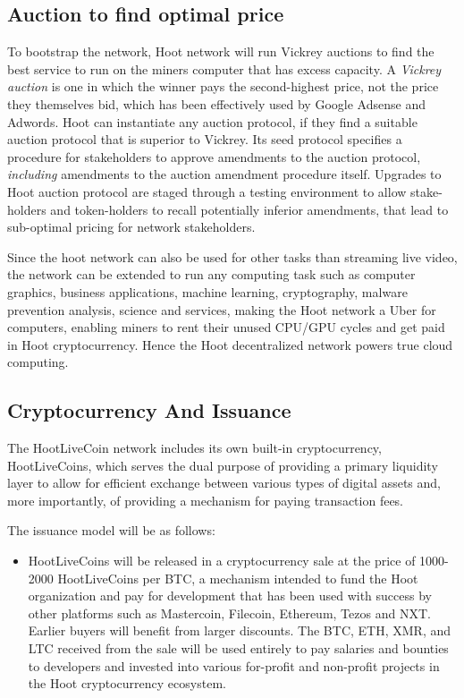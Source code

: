 \documentclass{article}
\begin{document}
\subsection{Auction to find optimal price}
To bootstrap the network, Hoot network will run Vickrey auctions to find the best service to run on the miners computer that has excess capacity. A \emph{Vickrey auction} is one in which the winner pays the second-highest price, not the price they themselves bid, which has been effectively used by Google Adsense and Adwords.
Hoot can instantiate any auction protocol, if they find a suitable auction protocol that is superior to Vickrey. Its seed protocol specifies a procedure for stakeholders to approve amendments to the auction protocol,
\emph{including} amendments to the auction amendment procedure itself. Upgrades to Hoot auction protocol are staged through a testing environment to allow stake-holders and token-holders to recall potentially inferior amendments, that lead to sub-optimal pricing for network stakeholders. 

Since the hoot network can also be used for other tasks than streaming live video, the network can be extended to run any computing task such as computer graphics, business applications, machine learning, cryptography, malware prevention analysis, science and services, making the Hoot network a Uber for computers, enabling miners to rent their unused CPU/GPU cycles and get paid in Hoot cryptocurrency. Hence the Hoot decentralized network powers true cloud computing.

\subsection{Cryptocurrency And Issuance}

The HootLiveCoin network includes its own built-in cryptocurrency, HootLiveCoins, which serves the dual purpose of providing a primary liquidity layer to allow for efficient exchange between various types of digital assets and, more importantly, of providing a mechanism for paying transaction fees.

The issuance model will be as follows:

\begin{itemize}

\item HootLiveCoins will be released in a cryptocurrency sale at the price of 1000-2000 HootLiveCoins per BTC, a mechanism intended to fund the Hoot organization and pay for development that has been used with success by other platforms such as Mastercoin, Filecoin, Ethereum, Tezos and NXT. Earlier buyers will benefit from larger discounts. The BTC, ETH, XMR, and LTC received from the sale will be used entirely to pay salaries and bounties to developers and invested into various for-profit and non-profit projects in the Hoot cryptocurrency ecosystem.

\end{itemize}
\end{document}
